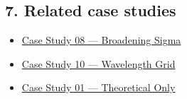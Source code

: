 \documentclass[
  11pt,
]{article}
\providecommand{\tightlist}{
  \setlength{\itemsep}{0pt}\setlength{\parskip}{0pt}}
\begin{document}
\hypertarget{7-related-case-studies}{
\subsection{7. Related case studies}\label{7-related-case-studies}}

\begin{itemize}
\tightlist
\item
  \href{https://github.com/pinarsyt/overlap-calculator/blob/main/case_studies/08_broadening_sigma/README.md}{Case
  Study 08 --- Broadening Sigma}
\item
  \href{https://github.com/pinarsyt/overlap-calculator/blob/main/case_studies/10_wavelength_grid/README.md}{Case
  Study 10 --- Wavelength Grid}
\item
  \href{https://github.com/pinarsyt/overlap-calculator/blob/main/case_studies/01_theoretical_only/README.md}{Case
  Study 01 --- Theoretical Only}
\end{itemize}
\end{document}
